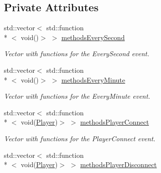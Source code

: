 \subsection*{Private Attributes}
\begin{DoxyCompactItemize}
\item 
\hypertarget{classEventManager_a8a435afc23d23b676bb39e1c209fa1cd}{std\-::vector$<$ std\-::function\\*
$<$ void()$>$ $>$ \hyperlink{classEventManager_a8a435afc23d23b676bb39e1c209fa1cd}{methods\-Every\-Second}}\label{classEventManager_a8a435afc23d23b676bb39e1c209fa1cd}

\begin{DoxyCompactList}\small\item\em Vector with functions for the Every\-Second event. \end{DoxyCompactList}\item 
\hypertarget{classEventManager_a597bdacbe09390cb276946a633fb444f}{std\-::vector$<$ std\-::function\\*
$<$ void()$>$ $>$ \hyperlink{classEventManager_a597bdacbe09390cb276946a633fb444f}{methods\-Every\-Minute}}\label{classEventManager_a597bdacbe09390cb276946a633fb444f}

\begin{DoxyCompactList}\small\item\em Vector with functions for the Every\-Minute event. \end{DoxyCompactList}\item 
\hypertarget{classEventManager_a98c39230b15f7d40fa5d3c87210a5fd9}{std\-::vector$<$ std\-::function\\*
$<$ void(\hyperlink{structPlayer}{Player})$>$ $>$ \hyperlink{classEventManager_a98c39230b15f7d40fa5d3c87210a5fd9}{methods\-Player\-Connect}}\label{classEventManager_a98c39230b15f7d40fa5d3c87210a5fd9}

\begin{DoxyCompactList}\small\item\em Vector with functions for the Player\-Connect event. \end{DoxyCompactList}\item 
\hypertarget{classEventManager_a05df9668a34f0dd3d4a9f049d884aea9}{std\-::vector$<$ std\-::function\\*
$<$ void(\hyperlink{structPlayer}{Player})$>$ $>$ \hyperlink{classEventManager_a05df9668a34f0dd3d4a9f049d884aea9}{methods\-Player\-Disconnect}}\label{classEventManager_a05df9668a34f0dd3d4a9f049d884aea9}


\end{DoxyCompactItemize}
